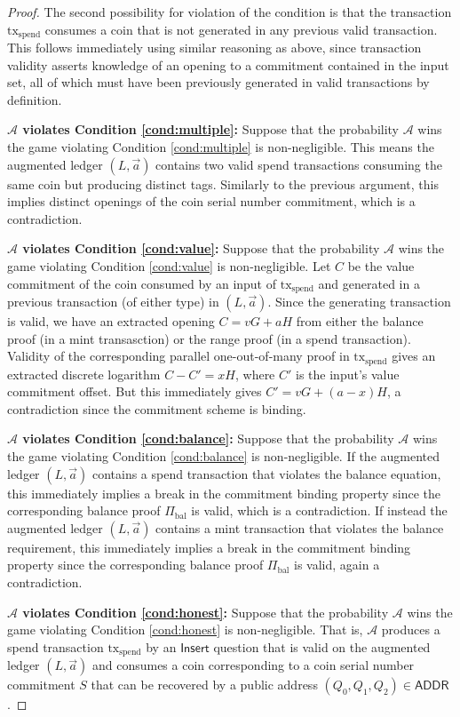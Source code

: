 \documentclass{llncs}
\newcommand{\func}[1]{\mathsf{#1}}
\begin{document}
\begin{proof}
The second possibility for violation of the condition is that the transaction $\text{tx}_{\text{spend}}$ consumes a coin that is not generated in any previous valid transaction.
This follows immediately using similar reasoning as above, since transaction validity asserts knowledge of an opening to a commitment contained in the input set, all of which must have been previously generated in valid transactions by definition.

\textbf{$\mathcal{A}$ violates Condition \ref{cond:multiple}:} Suppose that the probability $\mathcal{A}$ wins the game violating Condition \ref{cond:multiple} is non-negligible.
This means the augmented ledger $(L, \vec{a})$ contains two valid spend transactions consuming the same coin but producing distinct tags.
Similarly to the previous argument, this implies distinct openings of the coin serial number commitment, which is a contradiction.

\textbf{$\mathcal{A}$ violates Condition \ref{cond:value}:} Suppose that the probability $\mathcal{A}$ wins the game violating Condition \ref{cond:value} is non-negligible.
Let $C$ be the value commitment of the coin consumed by an input of $\text{tx}_{\text{spend}}$ and generated in a previous transaction (of either type) in $(L, \vec{a})$.
Since the generating transaction is valid, we have an extracted opening $C = vG + aH$ from either the balance proof (in a mint transasction) or the range proof (in a spend transaction).
Validity of the corresponding parallel one-out-of-many proof in $\text{tx}_{\text{spend}}$ gives an extracted discrete logarithm $C - C' = xH$, where $C'$ is the input's value commitment offset.
But this immediately gives $C' = vG + (a - x)H$, a contradiction since the commitment scheme is binding.

\textbf{$\mathcal{A}$ violates Condition \ref{cond:balance}:} Suppose that the probability $\mathcal{A}$ wins the game violating Condition \ref{cond:balance} is non-negligible.
If the augmented ledger $(L, \vec{a})$ contains a spend transaction that violates the balance equation, this immediately implies a break in the commitment binding property since the corresponding balance proof $\Pi_{\text{bal}}$ is valid, which is a contradiction.
If instead the augmented ledger $(L, \vec{a})$ contains a mint transaction that violates the balance requirement, this immediately implies a break in the commitment binding property since the corresponding balance proof $\Pi_{\text{bal}}$ is valid, again a contradiction.

\textbf{$\mathcal{A}$ violates Condition \ref{cond:honest}:} Suppose that the probability $\mathcal{A}$ wins the game violating Condition \ref{cond:honest} is non-negligible.
That is, $\mathcal{A}$ produces a spend transaction $\text{tx}_{\text{spend}}$ by an $\func{Insert}$ question that is valid on the augmented ledger $(L, \vec{a})$ and consumes a coin corresponding to a coin serial number commitment $S$ that can be recovered by a public address $(Q_0, Q_1, Q_2) \in \func{ADDR}$.


\end{proof}
\end{document}
